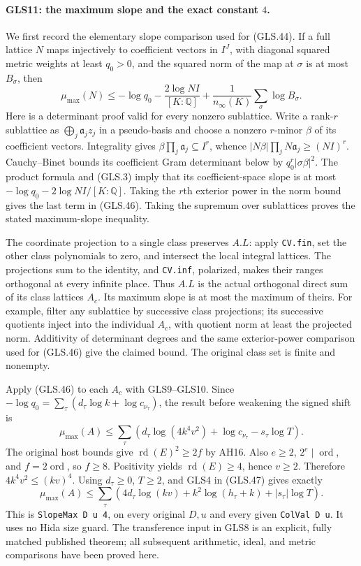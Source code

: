 \paragraph{GLS11: the maximum slope and the exact constant $4$.}
\label{claim:GLS11}
We first record the elementary slope comparison used for (GLS.44).
If a full lattice $N$ maps injectively to coefficient vectors in
$I^J$, with diagonal squared metric weights at least $q_0>0$, and
the squared norm of the map at $\sigma$ is at most $B_\sigma$, then
\[
 \mu_{\max}(N)\le-\log q_0
       -\frac{2\log NI}{[K:\mathbb Q]}
       +\frac1{n_\infty(K)}\sum_\sigma\log B_\sigma.
 \tag{GLS.46}
\]
Here is a determinant proof valid for every nonzero sublattice.
Write a rank-$r$ sublattice as $\bigoplus_j\mathfrak a_jz_j$ in
a pseudo-basis and choose a nonzero $r$-minor $\beta$ of its
coefficient vectors.  Integrality gives
$\beta\prod_j\mathfrak a_j\subseteq I^r$, whence
$|N\beta|\prod_jN\mathfrak a_j\ge(NI)^r$.
Cauchy--Binet bounds its coefficient Gram determinant below by
$q_0^r|\sigma\beta|^2$.  The product formula and (GLS.3) imply
that its coefficient-space slope is at most
$-\log q_0-2\log NI/[K:\mathbb Q]$.
Taking the $r$th exterior power in the norm bound gives the last
term in (GLS.46).  Taking the supremum over sublattices proves the
stated maximum-slope inequality.

The coordinate projection to a single class preserves $A.L$:
apply \texttt{CV.fin}, set the other class polynomials to zero,
and intersect the local integral lattices.  The projections sum to
the identity, and \texttt{CV.inf}, polarized, makes their ranges
orthogonal at every infinite place.  Thus $A.L$ is the actual
orthogonal direct sum of its class lattices $A_c$.
Its maximum slope is at most the maximum of theirs.  For example,
filter any sublattice by successive class projections; its successive
quotients inject into the individual $A_c$, with quotient norm at
least the projected norm.  Additivity of determinant degrees and
the same exterior-power comparison used for (GLS.46) give the
claimed bound.  The original class set is finite and nonempty.

Apply (GLS.46) to each $A_c$ with GLS9--GLS10.  Since
$-\log q_0=\sum_\tau(d_\tau\log k+\log c_{\nu_\tau})$,
the result before weakening the signed shift is
\[
 \mu_{\max}(A)\le
  \sum_\tau\left(d_\tau\log(4k^4v^2)
                    +\log c_{\nu_\tau}-s_\tau\log T\right).
 \tag{GLS.47}
\]
The original host bounds give $\operatorname{rd}(E)^2\ge2f$
by AH16.  Also $e\ge2$, $2^e\mid\operatorname{ord}$, and
$f=2\operatorname{ord}$, so $f\ge8$.  Positivity yields
$\operatorname{rd}(E)\ge4$, hence $v\ge2$.
Therefore $4k^4v^2\le(kv)^4$.  Using $d_\tau\ge0$,
$T\ge2$, and GLS4 in (GLS.47) gives exactly
\[
 \boxed{\quad
 \mu_{\max}(A)\le
   \sum_\tau\left(4d_\tau\log(kv)
          +k^2\log(h_\tau+k)+|s_\tau|\log T\right).
 \quad}                                                       \tag{GLS.48}
\]
This is \texttt{SlopeMax D u 4}, on every original $D,u$ and
every given \texttt{ColVal D u}.  It uses no Hida size guard.
The transference input in GLS8 is an explicit, fully matched
published theorem; all subsequent arithmetic, ideal, and metric
comparisons have been proved here.

